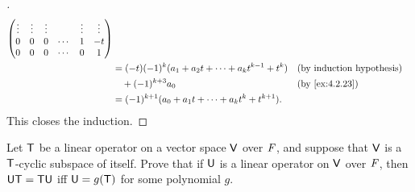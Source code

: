 \begin{proof}[]
\begin{align*}
\begin{pmatrix}
			                                      \vdots & \vdots & \vdots &        & \vdots & \vdots \\
			                                      0      & 0      & 0      & \cdots & 1      & -t     \\
			                                      0      & 0      & 0      & \cdots & 0      & 1
		                                      \end{pmatrix}                                                \\
		        & = (-t) (-1)^k (a_1 + a_2 t + \cdots + a_k t^{k - 1} + t^k)                               &  & \text{(by induction hypothesis)} \\
		        & \quad + (-1)^{k + 3} a_0                                                                 &  & \by{ex:4.2.23}                   \\
		        & = (-1)^{k + 1} (a_0 + a_1 t + \cdots + a_k t^k + t^{k + 1}).
	\end{align*}
	This closes the induction.
\end{proof}

\begin{ex}\label{ex:5.4.20}
	Let \(\mathsf{T}\) be a linear operator on a vector space \(\mathsf{V}\) over \(\mathit{F}\), and suppose that \(\mathsf{V}\) is a \(\mathsf{T}\)-cyclic subspace of itself.
	Prove that if \(\mathsf{U}\) is a linear operator on \(\mathsf{V}\) over \(\mathit{F}\), then \(\mathsf{U} \mathsf{T} = \mathsf{T} \mathsf{U}\) iff \(\mathsf{U} = g(\mathsf{T})\) for some polynomial \(g\).
\end{ex}

